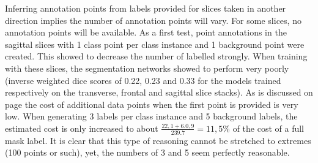 \par{
    Inferring annotation points from labels provided for slices taken in another direction implies the number of annotation points will vary.
    For some slices, no annotation points will be available.
    As a first test, point annotations in the sagittal slices with 1 class point per class instance and 1 background point were created.
    This showed to decrease the number of labelled strongly. When training with these slices, the segmentation networks showed to perform very poorly
    (inverse weighted dice scores of 0.22, 0.23 and 0.33 for the models trained respectively on the transverse, frontal and sagittal slice stacks).
    As is discussed on page \pageref{sec:trainingData} the cost of additional data points when the first point is provided is very low.
    When generating 3 labels per class instance and 5 background labels, the estimated cost is only increased to about $\frac{22,1 + 6.0,9}{239.7}=11,5\%$ of the cost of a full mask label.
    It is clear that this type of reasoning cannot be stretched to extremes (100 points or such), yet, the numbers of 3 and 5 seem perfectly reasonable.
}
